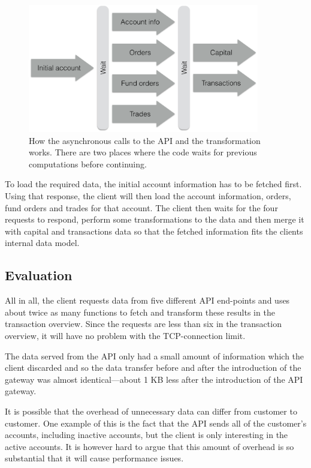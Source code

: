 \documentclass{cslthse-msc}
\begin{document}
\begin{figure}[H]
  \centering
    \begin{center}
      \includegraphics[width=0.9\textwidth]{images/bank_overview.png}
    \end{center}
  \caption{How the asynchronous calls to the API and the transformation works. There are two places where the code waits for previous computations before continuing.}
\end{figure}

To load the required data, the initial account information has to be fetched first. Using that response, the client will then load the account information, orders, fund orders and trades for that account. The client then waits for the four requests to respond, perform some transformations to the data and then merge it with capital and transactions data so that the fetched information fits the clients internal data model.

\subsection{Evaluation}
All in all, the client requests data from five different API end-points and uses about twice as many functions to fetch and transform these results in the transaction overview. Since the requests are less than six in the transaction overview, it will have no problem with the TCP-connection limit.

The data served from the API only had a small amount of information which the client discarded and so the data transfer before and after the introduction of the gateway was almost identical---about 1 KB less after the introduction of the API gateway.

It is possible that the overhead of unnecessary data can differ from customer to customer. One example of this is the fact that the API sends all of the customer's accounts, including inactive accounts, but the client is only interesting in the active accounts. It is however hard to argue that this amount of overhead is so substantial that it will cause performance issues.
\end{document}
